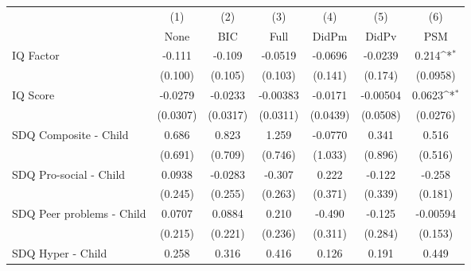 {
\def\sym#1{\ifmmode^{#1}\else\(^{#1}\)\fi}
\begin{tabular}{l*{6}{c}}
\toprule
            &\multicolumn{1}{c}{(1)}&\multicolumn{1}{c}{(2)}&\multicolumn{1}{c}{(3)}&\multicolumn{1}{c}{(4)}&\multicolumn{1}{c}{(5)}&\multicolumn{1}{c}{(6)}\\
            &\multicolumn{1}{c}{None}&\multicolumn{1}{c}{BIC}&\multicolumn{1}{c}{Full}&\multicolumn{1}{c}{DidPm}&\multicolumn{1}{c}{DidPv}&\multicolumn{1}{c}{PSM}\\
\midrule
IQ Factor   &      -0.111         &      -0.109         &     -0.0519         &     -0.0696         &     -0.0239         &       0.214\sym{*}  \\
            &     (0.100)         &     (0.105)         &     (0.103)         &     (0.141)         &     (0.174)         &    (0.0958)         \\
\addlinespace
IQ Score    &     -0.0279         &     -0.0233         &    -0.00383         &     -0.0171         &    -0.00504         &      0.0623\sym{*}  \\
            &    (0.0307)         &    (0.0317)         &    (0.0311)         &    (0.0439)         &    (0.0508)         &    (0.0276)         \\
\addlinespace
SDQ Composite - Child&       0.686         &       0.823         &       1.259         &     -0.0770         &       0.341         &       0.516         \\
            &     (0.691)         &     (0.709)         &     (0.746)         &     (1.033)         &     (0.896)         &     (0.516)         \\
\addlinespace
SDQ Pro-social - Child&      0.0938         &     -0.0283         &      -0.307         &       0.222         &      -0.122         &      -0.258         \\
            &     (0.245)         &     (0.255)         &     (0.263)         &     (0.371)         &     (0.339)         &     (0.181)         \\
\addlinespace
SDQ Peer problems - Child&      0.0707         &      0.0884         &       0.210         &      -0.490         &      -0.125         &    -0.00594         \\
            &     (0.215)         &     (0.221)         &     (0.236)         &     (0.311)         &     (0.284)         &     (0.153)         \\
\addlinespace
SDQ Hyper - Child&       0.258         &       0.316         &       0.416         &       0.126         &       0.191         &       0.449         \\

\end{tabular}}
